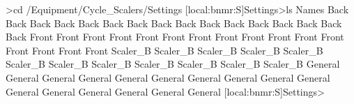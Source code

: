 \begin{DoxyCode}
>cd /Equipment/Cycle_Scalers/Settings
[local:bnmr:S]Settings>ls
Names
                                Back%
                                Back%
                                Back%
                                Back%
                                Back%
                                Back%
                                Back%
                                Back%
                                Back%
                                Back%
                                Back%
                                Back%
                                Back%
                                Back%
                                Back%
                                Back%
                                Front%
                                Front%
                                Front%
                                Front%
                                Front%
                                Front%
                                Front%
                                Front%
                                Front%
                                Front%
                                Front%
                                Front%
                                Front%
                                Front%
                                Front%
                                Front%
                                Scaler_B%
                                Scaler_B%
                                Scaler_B%
                                Scaler_B%
                                Scaler_B%
                                Scaler_B%
                                Scaler_B%
                                Scaler_B%
                                Scaler_B%
                                Scaler_B%
                                Scaler_B%
                                Scaler_B%
                                General%
                                General%
                                General%
                                General%
                                General%
                                General%
                                General%
                                General%
                                General%
                                General%
                                General%
                                General%
                                General%
                                General%
                                General%
                                General%
[local:bnmr:S]Settings> 
\end{DoxyCode}


